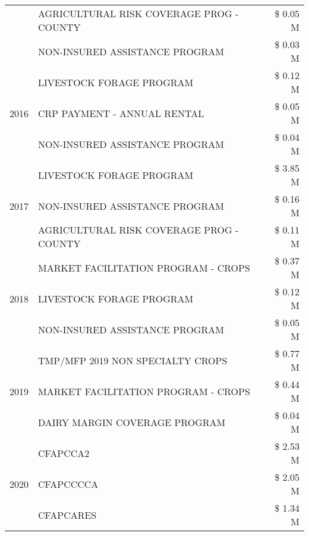 \begin{tabular}{llr}
 & AGRICULTURAL RISK COVERAGE PROG - COUNTY & \$ 0.05 M \\
 & NON-INSURED ASSISTANCE PROGRAM & \$ 0.03 M \\
\cline{1-3}
\multirow[t]{3}{*}{2016} & LIVESTOCK FORAGE PROGRAM                      & \$ 0.12 M \\
 & CRP PAYMENT - ANNUAL RENTAL                   & \$ 0.05 M \\
 & NON-INSURED ASSISTANCE PROGRAM                & \$ 0.04 M \\
\cline{1-3}
\multirow[t]{3}{*}{2017} & LIVESTOCK FORAGE PROGRAM & \$ 3.85 M \\
 & NON-INSURED ASSISTANCE PROGRAM & \$ 0.16 M \\
 & AGRICULTURAL RISK COVERAGE PROG - COUNTY & \$ 0.11 M \\
\cline{1-3}
\multirow[t]{3}{*}{2018} & MARKET FACILITATION PROGRAM - CROPS & \$ 0.37 M \\
 & LIVESTOCK FORAGE PROGRAM & \$ 0.12 M \\
 & NON-INSURED ASSISTANCE PROGRAM & \$ 0.05 M \\
\cline{1-3}
\multirow[t]{3}{*}{2019} & TMP/MFP 2019 NON SPECIALTY CROPS & \$ 0.77 M \\
 & MARKET FACILITATION PROGRAM - CROPS & \$ 0.44 M \\
 & DAIRY MARGIN COVERAGE PROGRAM & \$ 0.04 M \\
\cline{1-3}
\multirow[t]{3}{*}{2020} & CFAPCCA2 & \$ 2.53 M \\
 & CFAPCCCCA & \$ 2.05 M \\
 & CFAPCARES & \$ 1.34 M \\
\cline{1-3}
\bottomrule
\end{tabular}
